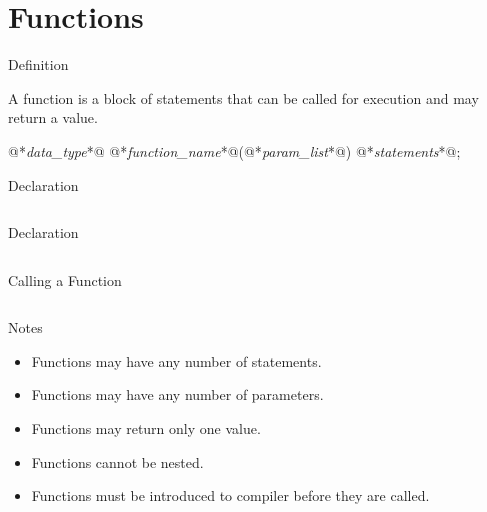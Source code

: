 \documentclass[compress]{beamer}
\begin{document}
\prepareCover

\section{Functions}

\begin{slide}
	\begin{block}{Definition}

	A function is a block of statements that can be called for execution and may return a value.

	\begin{terminal}
	@*\textit{data\_type}*@ @*\textit{function\_name}*@(@*\textit{param\_list}*@)
	{
	    @*\textit{statements}*@;
	}
	\end{terminal}

	\end{block}
\end{slide}

\begin{slide}
	\begin{block}{Declaration}

	\inputminted[firstline=15,lastline=18,linenos]{c}{
		\resDirectory/function.c
	}

	\end{block}
\end{slide}

\begin{slide}
	\begin{block}{Declaration}

	\inputminted[fontsize=\scriptsize,firstline=24,lastline=37,linenos]{c}{
		\resDirectory/function.c
	}

	\end{block}
\end{slide}

\begin{slide}
	\begin{block}{Calling a Function}

	\inputminted[fontsize=\small,firstline=43,lastline=50,linenos]{c}{
		\resDirectory/function.c
	}

	\end{block}
\end{slide}

\begin{slide}
	\begin{block}{Notes}

	\begin{itemize}
	\item[] Functions may have any number of statements.
	\item[] Functions may have any number of parameters.
	\item[] Functions may return only one value.
	\item[] Functions cannot be nested.
	\item[] Functions must be introduced to compiler before they are called.
	\end{itemize}

	\end{block}
\end{slide}
\end{document}
